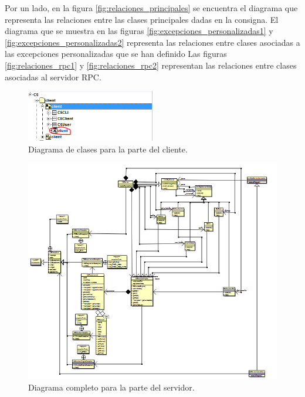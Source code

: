 \documentclass[a4paper,12pt]{article}
\begin{document}
Por un lado, en la figura \ref{fig:relaciones_principales} se encuentra el diagrama que representa las relaciones entre las clases principales dadas en la consigna.
El diagrama que se muestra en las figuras \ref{fig:excepciones_personalizadas1} y \ref{fig:excepciones_personalizadas2}
representa las relaciones entre clases asociadas a las excepciones personalizadas que se han definido
Las figuras \ref{fig:relaciones_rpc1} y \ref{fig:relaciones_rpc2} representan las relaciones entre clases asociadas al servidor RPC.

\begin{figure}[htbp]
    \centering
    \includegraphics[width=0.5\textwidth]{C5/Esquema_general_C5_cliente_panel.PNG}
    \caption{Diagrama de clases para la parte del cliente.}
    \label{fig:cliente}
\end{figure}

\begin{figure}[htbp]
    \centering
    \includegraphics[width=\textwidth]{C5/Esquema_general_C5_server_todo.PNG}
    \caption{Diagrama completo para la parte del servidor.}
    \label{fig:servidor}
\end{figure}
\end{document}
